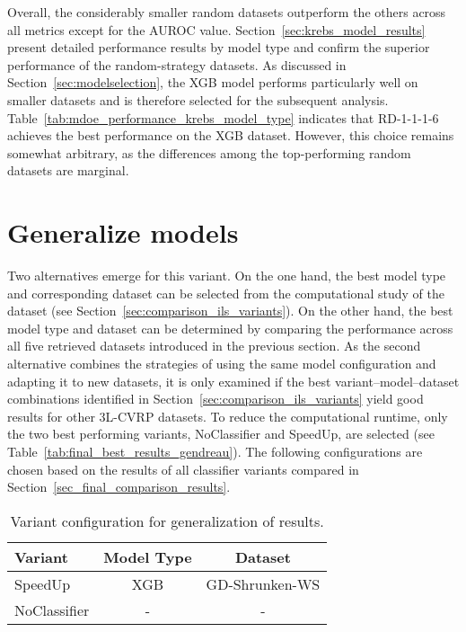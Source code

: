 Overall, the considerably smaller random datasets outperform the others across all metrics except for the \gls{AUROC} value. Section~\ref{sec:krebs_model_results}
present detailed performance results by model type and confirm the superior performance of the random-strategy datasets.
As discussed in Section~\ref{sec:modelselection}, the \gls{XGB} model performs particularly well on smaller datasets and is therefore selected for the subsequent analysis.
Table~\ref{tab:mdoe_performance_krebs_model_type} indicates that RD-1-1-1-6 achieves the best performance on the \gls{XGB} dataset. However, this choice remains somewhat arbitrary,
as the differences among the top-performing random datasets are marginal.



\section{Generalize \gendreauDataSetText models}
\label{sec:krebs_data_pretrained_models}

Two alternatives emerge for this variant. On the one hand, the best model type and corresponding dataset can be selected
from the computational study of the \gendreauDataSet dataset (see Section~\ref{sec:comparison_ils_variants}). On the other hand, the
best model type and dataset can be determined by comparing the performance across all five \krebsADataSetText retrieved datasets introduced in the previous section.
As the second alternative combines the strategies of using the same model configuration and adapting it to new datasets, it is
only examined if the best variant–model–dataset combinations identified in Section~\ref{sec:comparison_ils_variants} yield good
results for other \gls{3L-CVRP} datasets. To reduce the computational runtime, only the two best performing variants, NoClassifier
and SpeedUp, are selected (see Table~\ref{tab:final_best_results_gendreau}). The following configurations are chosen based
on the results of all classifier variants compared in Section~\ref{sec_final_comparison_results}.

\begin{table}[ht]
    \centering
    \small
    \begin{tabular}{l c c  }
        \toprule
        Variant      & Model Type & Dataset        \\
        \midrule
        SpeedUp      & XGB        & GD-Shrunken-WS \\
        NoClassifier & -          & -              \\
        \bottomrule
    \end{tabular}
    \caption{Variant configuration for generalization of \gendreauDataSetText results.}
    \label{tab:model_configuration_krebs}
\end{table}

